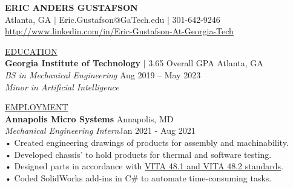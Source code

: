 \documentclass{article}
\begin{document}
\title{}
\author{}
\date{}
\maketitle

\thispagestyle{empty} %


\begin{center}\textbf{\Huge ERIC ANDERS GUSTAFSON}\\
\large\linkcolor Atlanta, GA  $|$ {\color{blue} Eric.Gustafson@GaTech.edu} $|$  301-642-9246\\
\linkcolor\href{http://www.linkedin.com/in/Eric-Gustafson-At-Georgia-Tech}{http://www.linkedin.com/in/Eric-Gustafson-At-Georgia-Tech}\\
\end{center}

\underline{\Large E\normalsize DUCATION\qquad\qquad\qquad\qquad\qquad\qquad\qquad\qquad\qquad\qquad\qquad\qquad\qquad\qquad\qquad\qquad\qquad\qquad\qquad\qquad\quad}\\
\large \textbf{Georgia Institute of Technology} $|$ 3.65 Overall GPA    \hfill Atlanta, GA\\
\large\textit{BS in Mechanical Engineering}     \hfill Aug 2019 – May 2023\\
\large\textit{Minor in Artificial Intelligence}\\

\vspace{3mm} %

\underline{\Large E\normalsize MPLOYMENT\qquad\qquad\qquad\qquad\qquad\qquad\qquad\qquad\qquad\qquad\qquad\qquad\qquad\qquad\qquad\qquad\qquad\qquad\qquad\quad}\\
\large\textbf{Annapolis Micro Systems} \hfill Annapolis, MD\\
\large\textit{Mechanical Engineering Intern}\hfill Jan 2021 - Aug 2021\\
\qquad • \quad Created engineering drawings of products for assembly and machinability.\\
\qquad • \quad Developed chassis' to hold products for thermal and software testing. \\
\qquad • \quad Designed parts in accordance with \linkcolor\href{https://www.vita.com/VITA-Announcements/9204245}{VITA 48.1 and VITA 48.2 standards}. \\ %
\qquad • \quad Coded SolidWorks add-ins in C\# to automate time-consuming tasks.\\
\vspace{3mm} %
\end{document}

